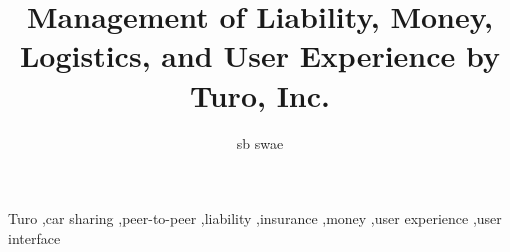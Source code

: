 \documentclass[review,12pt]{elsarticle}
\begin{document}
\begin{frontmatter}


\title{Management of Liability, Money, Logistics, and User Experience by Turo, Inc.}




\author{sb swae}

\address{\href{mailto:sb.swae@gmail.com}{sb.swae@gmail.com}; \url{https://swaevior.io}}

\begin{abstract}
\blindtext
\end{abstract}

\begin{keyword}
Turo \sep car sharing \sep peer-to-peer \sep liability \sep insurance \sep money \sep user experience \sep user interface


\end{keyword}

\end{frontmatter}

\linenumbers

\end{document}
